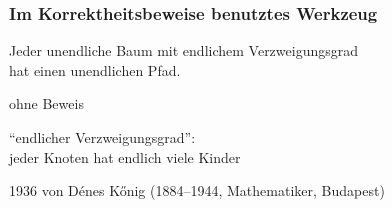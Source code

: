     \begin{frame}
      \frametitle{Im Korrektheitsbeweise benutztes Werkzeug}
      
      \begin{Lemma}
        Jeder unendliche Baum mit endlichem Verzweigungsgrad\\
        hat einen unendlichen Pfad.
      \end{Lemma}
      
      \par\bigskip
        \begin{Itemize}
          \item
            ohne Beweis
          \item
            "`endlicher Verzweigungsgrad"':\\
            jeder Knoten hat endlich viele Kinder
          \item
            1936 von D\'enes K\H onig (1884--1944, Mathematiker, Budapest)
        \end{Itemize}
      
    \end{frame}


